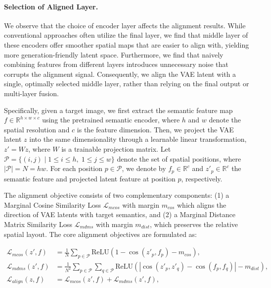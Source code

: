 \documentclass{llmxive}
\begin{document}
\paragraph{Selection of Aligned Layer.}
We observe that the choice of encoder layer affects the alignment results. While conventional approaches often utilize the final layer, we find that middle layer of these encoders offer smoother spatial maps that are easier to align with, yielding more generation-friendly latent space. Furthermore, we find that naively combining features from different layers introduces unnecessary noise that corrupts the alignment signal. Consequently, we align the VAE latent with a single, optimally selected middle layer, rather than relying on the final output or multi-layer fusion.

Specifically, given a target image, we first extract the semantic feature map $f \in \mathbb{R}^{h \times w \times c}$ using the pretrained semantic encoder, where $h$ and $w$ denote the spatial resolution and $c$ is the feature dimension. Then, we project the VAE latent $z$ into the same dimensionality through a learnable linear transformation, $z' = Wz$, where $W$ is a trainable projection matrix. Let $\mathcal{P} = \{(i,j) \mid 1 \le i \le h,\; 1 \le j \le w\}$ denote the set of spatial positions, where $|\mathcal{P}| = N = hw$. For each position $p \in \mathcal{P}$, we denote by $f_p \in \mathbb{R}^{c}$ and $z'_p \in \mathbb{R}^{c}$ the semantic feature and projected latent feature at position $p$, respectively.

The alignment objective consists of two complementary components: (1) a Marginal Cosine Similarity Loss $\mathcal{L}_{mcos}$ with margin $m_{cos}$ which aligns the direction of VAE latents with target semantics, and (2) a Marginal Distance Matrix Similarity Loss $\mathcal{L}_{mdms}$ with margin $m_{dist}$, which preserves the relative spatial layout. The core alignment objectives are formulated as:

\begin{align}
\mathcal{L}_{mcos}(z', f)
&= \frac{1}{N} \sum_{p \in \mathcal{P}} \mathrm{ReLU} \left( 1 - \cos(z'_p, f_p) - m_{cos}\right), \\
\mathcal{L}_{mdms}(z', f)
&= \frac{1}{N^2} \sum_{p \in \mathcal{P}} \sum_{q \in \mathcal{P}} \mathrm{ReLU} \left( \left| \cos(z'_p, z'_q) - \cos(f_p, f_q) \right| - m_{dist} \right), \\
\mathcal{L}_{align}(z, f)
&= \mathcal{L}_{mcos}(z', f) + \mathcal{L}_{mdms}(z', f),
\end{align}
\end{document}
